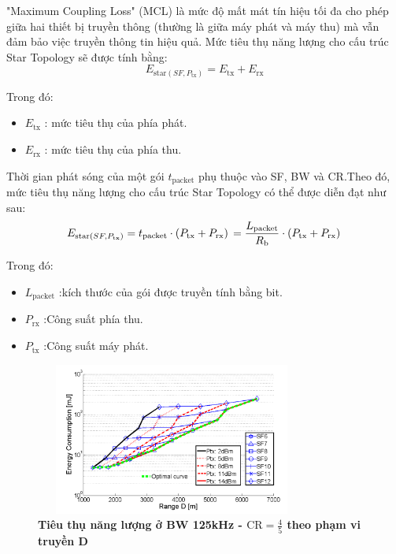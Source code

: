 \documentclass{article} %
\begin{document}
	"Maximum Coupling Loss" (MCL) là mức độ mất mát tín hiệu tối đa cho phép giữa hai thiết bị truyền thông (thường là giữa máy phát và máy thu) mà vẫn đảm bảo việc truyền thông tin hiệu quả.
	\newpage
	Mức tiêu thụ năng lượng cho cấu trúc Star Topology sẽ được tính bằng\cite{ochoa2017evaluating}:
	\begin{equation}
		E_{\mathrm{star}\left(S F, P_{\mathrm{tx}}\right)}=  E_{\mathrm{tx}}+E_{\mathrm{rx}}    
	\end{equation}
	
	Trong đó:
	\begin{itemize}
		\item $E_{\mathrm{tx}}$ : mức tiêu thụ của phía phát.
		\item $E_{\mathrm{rx}}$ : mức tiêu thụ của phía thu.
	\end{itemize}
	
	Thời gian phát sóng của một gói $t_{\mathrm{packet}}$ phụ thuộc vào SF, BW và CR.Theo đó, mức tiêu thụ năng lượng cho cấu trúc Star Topology có thể được diễn đạt như sau\cite{ochoa2017evaluating}:
	\begin{equation}
		E_{\mathrm{star}\left(S F, P_{\mathrm{tx}}\right)}=t_{\mathrm{packet}} \cdot\left(P_{\mathrm{tx}}+P_{\mathrm{rx}}\right) \\
		=\frac{L_{\mathrm{packet}}}{R_{\mathrm{b}}} \cdot\left(P_{\mathrm{tx}}+P_{\mathrm{rx}}\right) \\    
	\end{equation}
	
	Trong đó:
	\begin{itemize}
		\item $L_{\mathrm{packet}}$ :kích thước của gói được truyền tính bằng bit.
		\item $P_{\mathrm{rx}}$ :Công suất phía thu.
		\item $P_{\mathrm{tx}}$ :Công suất máy phát.
	\end{itemize}
	
	\begin{figure}[!ht]
		\centering
		\includegraphics[width=9cm,height=5cm]{Images/tieuthu125.png}
		\caption[Tiêu thụ năng lượng  ở BW 125kHz - $\mathrm{CR}=\frac{4}{5}$ theo phạm vi truyền D\cite{ochoa2017evaluating}]
		{\bfseries \fontsize{12pt}{0pt}\selectfont Tiêu thụ năng lượng  ở BW 125kHz -  $\mathrm{CR}=\frac{4}{5}$ theo phạm vi truyền D\cite{ochoa2017evaluating}}
		\label{tieuthu125}
	\end{figure}
	
\end{document}

